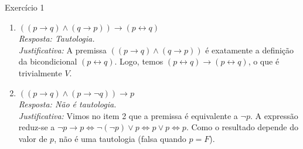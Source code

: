 \documentclass[a4paper,11pt]{article}
\theoremstyle{definition}
\theoremstyle{plain}
\theoremstyle{remark}
\newcounter{questao}[section]
\begin{document}
\begin{questaoManually}{Exercício 1}
\begin{enumerate}
\item \textbf{$((p \to q) \land (q \to p)) \to (p \leftrightarrow q)$} \\
\textit{Resposta: Tautologia.} \\
\textit{Justificativa:} A premissa $((p \to q) \land (q \to p))$ é exatamente a definição da bicondicional $(p \leftrightarrow q)$. Logo, temos $(p \leftrightarrow q) \to (p \leftrightarrow q)$, o que é trivialmente $V$.

\item \textbf{$((p \to q) \land (p \to \neg q)) \to p$} \\
\textit{Resposta: Não é tautologia.} \\
\textit{Justificativa:} Vimos no item 2 que a premissa é equivalente a $\neg p$. A expressão reduz-se a $\neg p \to p \iff \neg(\neg p) \lor p \iff p \lor p \iff p$. Como o resultado depende do valor de $p$, não é uma tautologia (falsa quando $p = F$).
\end{enumerate}

\end{questaoManually}
\end{document}
